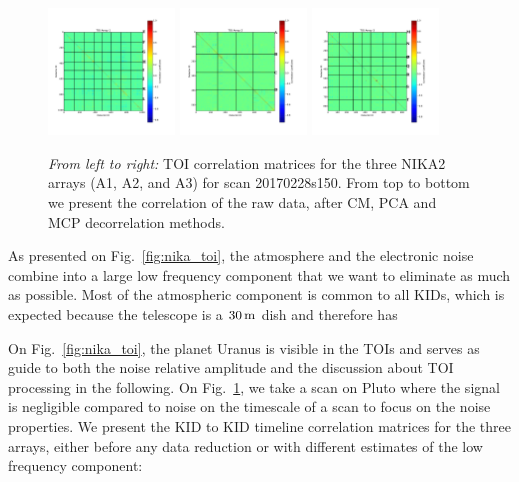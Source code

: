 \begin{figure}[ht!]
\begin{center}
\includegraphics[width=0.3\textwidth]{Figures/NoiseTests/corrmat_TOI_BCP_array_1_20170228s151.pdf}
\includegraphics[width=0.3\textwidth]{Figures/NoiseTests/corrmat_TOI_BCP_array_2_20170228s151.pdf}
\includegraphics[width=0.3\textwidth]{Figures/NoiseTests/corrmat_TOI_BCP_array_3_20170228s151.pdf}
\end{center}
\caption[KID-to-KID correlation matrices]{\emph{From left to right:} TOI correlation
  matrices for the three NIKA2 arrays (A1, A2, and A3) for scan
  20170228s150. From top to bottom we present the correlation of the raw data,
  after CM, PCA and MCP decorrelation methods. \label{corrmatrix}}
\end{figure}

As presented on Fig.~\ref{fig:nika_toi}, the atmosphere and the electronic noise
combine into a large low frequency component that we want to eliminate as much
as possible. Most of the atmospheric component is common to all KIDs, which is
expected because the telescope is a $30\,\rm{m}$ dish and therefore
has  

On Fig.~\ref{fig:nika_toi}, the planet Uranus is visible in the TOIs and serves as
guide to both the noise relative amplitude and the discussion about TOI
processing in the following. On Fig.~\ref{corrmatrix}, we take a scan on Pluto
where the signal is negligible compared to noise on the timescale of a scan to
focus on the noise properties. We present the KID to KID timeline correlation
matrices for the three arrays, either before any data reduction or with
different estimates of the low frequency component:

